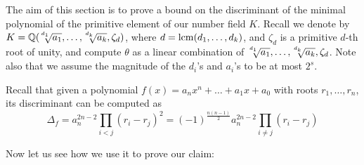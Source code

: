 The aim of this section is to prove a bound on the discriminant of the minimal polynomial of the primitive element of our number field $K$. Recall we denote by $K = \QQ(\mysqrt{d_1}{a_1},\ldots,\mysqrt{d_k}{a_k}, \zeta_d)$, where $d=\operatorname{lcm}(d_1,\ldots,d_k)$, and $\zeta_d$ is a primitive $d$-th root of unity, and compute $\theta$ as a linear combination of $\mysqrt{d_1}{a_1},\ldots,\mysqrt{d_k}{a_k}, \zeta_d$. Note also that we assume the magnitude of the $d_i$'s and $a_i$'s to be at most $2^s$.

Recall that given a polynomial $f(x) = a_nx^n + \ldots + a_1x + a_0$ with roots $r_1,\ldots,r_n$, its discriminant can be computed as
\begin{equation}\label{eq:disc_formula}
    \Delta_{f} = a_n^{2n-2} \prod_{i<j} (r_i-r_j)^2 = (-1)^{\frac{n(n-1)}{2}} a_n^{2n-2} \prod_{i\neq j}(r_i-r_j)
\end{equation}

Now let us see how we use it to prove our claim:
\bounddiscriminant*


